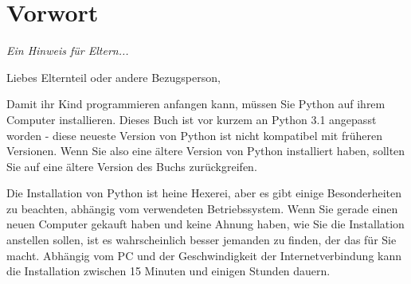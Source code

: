 

\chapter*{Vorwort}\normalsize
\begin{center}
{\em Ein Hinweis für Eltern...}
\end{center}
\pagestyle{plain}

\noindent
Liebes Elternteil oder andere Bezugsperson,

Damit ihr Kind programmieren anfangen kann, müssen Sie Python auf ihrem Computer installieren. Dieses Buch ist vor kurzem an Python 3.1 angepasst worden - diese neueste Version von Python ist nicht kompatibel mit früheren Versionen. Wenn Sie also eine ältere Version von Python installiert haben, sollten Sie auf eine ältere Version des Buchs zurückgreifen.

Die Installation von Python ist heine Hexerei, aber es gibt einige Besonderheiten zu beachten, abhängig vom verwendeten Betriebssystem. Wenn Sie gerade einen neuen Computer gekauft haben und keine Ahnung haben, wie Sie die Installation anstellen sollen, ist es wahrscheinlich besser jemanden zu finden, der das für Sie macht. Abhängig vom PC und der Geschwindigkeit der Internetverbindung kann die Installation zwischen 15 Minuten und einigen Stunden dauern.


